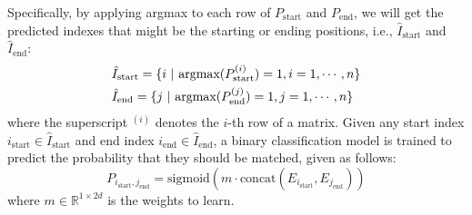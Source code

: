 \documentclass[11pt,a4paper]{article}
\begin{document}
Specifically, by applying argmax to each row of $P_\text{start}$ and $P_\text{end}$, we will get
the predicted indexes that might be the starting or ending positions, i.e., 
 $\hat{I}_\text{start}$  and $\hat{I}_\text{end}$:
\begin{equation}
\begin{aligned}
\small
&\hat{I}_\text{start}=\{i~|~\text{argmax}(P_\text{start}^{(i)})=1,i=1,\cdots,n\}\\
&\hat{I}_\text{end}=\{j~|~\text{argmax}(P_\text{end}^{(j)})=1,j=1,\cdots,n\}
\end{aligned}
\end{equation}
where the superscript $^{(i)}$ denotes the $i$-th row of a matrix. Given any start index $i_\text{start}\in \hat{I}_\text{start}$ and end index  $i_\text{end}\in \hat{I}_\text{end}$, 
a binary classification model is trained to predict 
the probability that they should be matched, given as follows: 
\begin{equation}
\label{equ4}
    P_{i_\text{start},j_\text{end}}=\text{sigmoid}(m\cdot\text{concat}(E_{i_\text{start}}, E_{j_\text{end}}))
\end{equation}
where $m\in\mathbb{R}^{1\times 2d}$ is the weights to learn.
\end{document}
